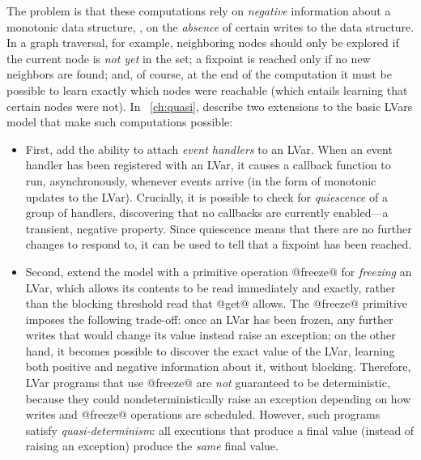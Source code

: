 The problem is that these computations rely on \emph{negative}
information about a monotonic data structure, \ie, on the
\emph{absence} of certain writes to the data structure.  In a graph
traversal, for example, neighboring nodes should only be explored if
the current node is \emph{not yet} in the set; a fixpoint is reached
only if no new neighbors are found; and, of course, at the end of the
computation it must be possible to learn exactly which nodes were
reachable (which entails learning that certain nodes were not).  In ~\ref{ch:quasi},  describe two extensions to the basic LVars
model that make such computations possible:
\begin{itemize}
\item First,  add the ability to attach \emph{event handlers} to an
  LVar.  When an event handler has been registered with an LVar, it
  causes a callback function to run, asynchronously, whenever
  events arrive (in the form of monotonic updates to the LVar).
  Crucially, it is possible to check for \emph{quiescence} of a group
  of handlers, discovering that no callbacks are currently enabled---a
  transient, negative property.  Since quiescence means that there are
  no further changes to respond to, it can be used to tell that a
  fixpoint has been reached.
\item Second,  extend the model with a primitive operation @freeze@
  for \emph{freezing} an LVar, which allows its contents to be read
  immediately and exactly, rather than the blocking threshold read
  that @get@ allows.  The @freeze@ primitive imposes the following
  trade-off: once an LVar has been frozen, any further writes that
  would change its value instead raise an exception; on the other
  hand, it becomes possible to discover the exact value of the LVar,
  learning both positive and negative information about it, without
  blocking.  Therefore, LVar programs that use @freeze@ are \emph{not}
  guaranteed to be deterministic, because they could
  nondeterministically raise an exception depending on how writes and
  @freeze@ operations are scheduled.  However, such programs satisfy
  \emph{quasi-determinism}: all executions that produce a final value
  (instead of raising an exception)
  produce the \emph{same} final value.
\end{itemize}


